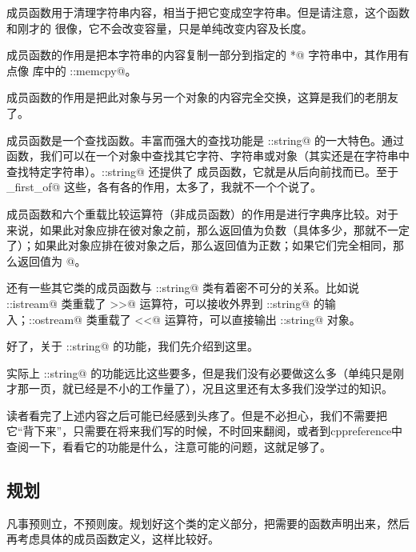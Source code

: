 \lstinline@clear@ 成员函数用于清理字符串内容，相当于把它变成空字符串。但是请注意，这个函数和刚才的 \lstinline@erase@ 很像，它不会改变容量，只是单纯改变内容及长度。\par
\lstinline@copy@ 成员函数的作用是把本字符串的内容复制一部分到指定的 \lstinline@char*@ 字符串中，其作用有点像 \lstinline@cstring@ 库中的 \lstinline@std::memcpy@。\par
\lstinline@swap@ 成员函数的作用是把此对象与另一个对象的内容完全交换，这算是我们的老朋友了。\par
\lstinline@find@ 成员函数是一个查找函数。丰富而强大的查找功能是 \lstinline@std::string@ 的一大特色。通过 \lstinline@find@ 函数，我们可以在一个对象中查找其它字符、字符串或对象（其实还是在字符串中查找特定字符串）。\lstinline@std::string@ 还提供了 \lstinline@rfind@ 成员函数，它就是从后向前找而已。至于 \lstinline@find_first_of@ 这些，各有各的作用，太多了，我就不一个个说了。\par
\lstinline@compare@ 成员函数和六个重载比较运算符（非成员函数）的作用是进行字典序比较。对于 \lstinline@compare@ 来说，如果此对象应排在彼对象之前，那么返回值为负数（具体多少，那就不一定了）；如果此对象应排在彼对象之后，那么返回值为正数；如果它们完全相同，那么返回值为 @。\par
还有一些其它类的成员函数与 \lstinline@std::string@ 类有着密不可分的关系。比如说 \lstinline@std::istream@ 类重载了 \lstinline@>>@ 运算符，可以接收外界到 \lstinline@std::string@ 的输入；\lstinline@std::ostream@ 类重载了 \lstinline@<<@ 运算符，可以直接输出 \lstinline@std::string@ 对象。\par
好了，关于 \lstinline@std::string@ 的功能，我们先介绍到这里。\par
实际上 \lstinline@std::string@ 的功能远比这些要多，但是我们没有必要做这么多（单纯只是刚才那一页，就已经是不小的工作量了），况且这里还有太多我们没学过的知识。\par
读者看完了上述内容之后可能已经感到头疼了。但是不必担心，我们不需要把它``背下来''，只需要在将来我们写的时候，不时回来翻阅，或者到cppreference中查阅一下，看看它的功能是什么，注意可能的问题，这就足够了。\par
\subsection*{规划}
凡事预则立，不预则废。规划好这个类的定义部分，把需要的函数声明出来，然后再考虑具体的成员函数定义，这样比较好。\par
